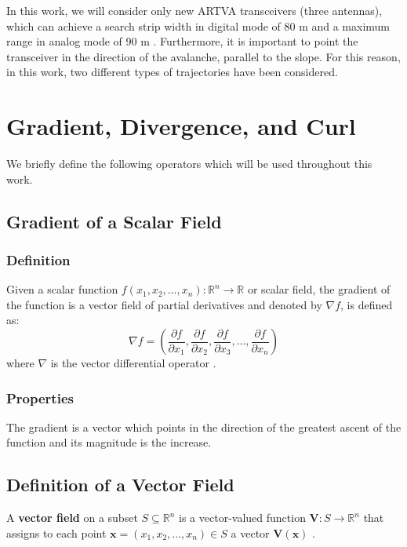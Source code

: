 In this work, we will consider only new ARTVA transceivers (three antennas), 
which can achieve a search strip width in digital mode of 80 m and a maximum 
range in analog mode of 90 m \cite{manual}. Furthermore, it is important to point 
the transceiver in the direction of the avalanche, parallel to the slope. For 
this reason, in this work, two different types of trajectories have been 
considered.

\section{Gradient, Divergence, and Curl} \label{Gradient, Divergence, and Curl}
We briefly define the following operators which will be used throughout this 
work.

\subsection{Gradient of a Scalar Field}
\subsubsection{Definition}
Given a scalar function \( f(x_1, x_2, \ldots, x_n): \mathbb{R}^n \to \mathbb{R} 
\) or scalar field, the gradient of the function is a vector field of partial 
derivatives and denoted by \( \nabla f \), is defined as:
\begin{equation}
\nabla f = \left( \frac{\partial f}{\partial x_1}, \frac{\partial f}{\partial 
x_2}, \frac{\partial f}{\partial x_3}, \ldots, \frac{\partial f}{\partial x_n} 
\right)
\label{eq:gradient}
\end{equation}
where \( \nabla \) is the vector differential operator \cite{math-book}.

\subsubsection{Properties}
The gradient is a vector which points in the direction of the greatest ascent of 
the function and its magnitude is the increase.

\subsection{Definition of a Vector Field}
A \textbf{vector field} on a subset \(S \subseteq \mathbb{R}^n\) is a 
vector-valued function \(\mathbf{V}: S \to \mathbb{R}^n\) that assigns to each 
point \(\mathbf{x} = (x_1, x_2, \ldots, x_n) \in S\) a vector 
\(\mathbf{V}(\mathbf{x})\) \cite{math-book}.

